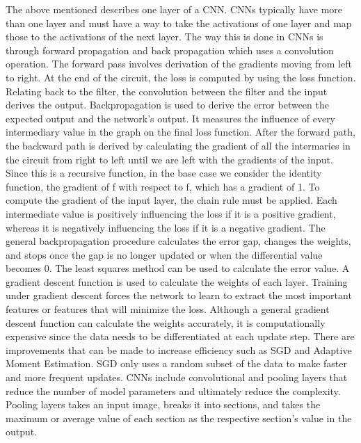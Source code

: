 \documentclass[10pt,twocolumn]{article}
\begin{document}
The above mentioned describes one layer of a CNN. CNNs typically have more than one layer and must have a way to take the activations of one layer and map those to the activations of the next layer. The way this is done in CNNs is through forward propagation and back propagation which uses a convolution operation. The forward pass involves derivation of the gradients moving from left to right. At the end of the circuit, the loss is computed by using the loss function. Relating back to the filter, the convolution between the filter and the input derives the output. Backpropagation is used to derive the error between the expected output and the network’s output. It measures the influence of every intermediary value in the graph on the final loss function. After the forward path, the backward path is derived by calculating the gradient of all the intermaries in the circuit from right to left until we are left with the gradients of the input. Since this is a recursive function, in the base case we consider the identity function, the gradient of f with respect to f, which has a gradient of 1. To compute the gradient of the input layer, the chain rule must be applied. Each intermediate value is positively influencing the loss if it is a positive gradient, whereas it is negatively influencing the loss if it is a negative gradient. The general backpropagation procedure calculates the error gap, changes the weights, and stops once the gap is no longer updated or when the differential value becomes 0. The least squares method can be used to calculate the error value. A gradient descent function is used to calculate the weights of each layer. Training under gradient descent forces the network to learn to extract the most important features or features that will minimize the loss. Although a general gradient descent function can calculate the weights accurately, it is computationally expensive since the data needs to be differentiated at each update step. There are improvements that can be made to increase efficiency such as SGD and Adaptive Moment Estimation. SGD only uses a random subset of the data to make faster and more frequent updates. CNNs include convolutional and pooling layers that reduce the number of model parameters and ultimately reduce the complexity. Pooling layers takes an input image, breaks it into sections, and takes the maximum or average value of each section as the respective section’s value in the output. 


\printbibliography 
\end{document}

